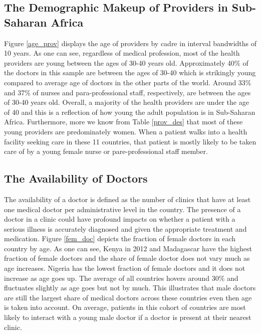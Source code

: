\documentclass{article}                 %
\begin{document}
	\subsection{The Demographic Makeup of Providers in Sub-Saharan Africa}
	
	Figure \ref{age_prov} displays the age of providers by cadre in interval bandwidths of 10 years. As one can see, regardless of medical profession, most of the health providers are young between the ages of 30-40 years old. Approximately 40\% of the doctors in this sample are between the ages of 30-40 which is strikingly young compared to average age of doctors in the other parts of the world. Around 33\% and 37\% of nurses and para-professional staff, respectively, are between the ages of 30-40 years old. Overall, a majority of the health providers are under the age of 40 and this is a reflection of how young the adult population is in Sub-Saharan Africa. Furthermore, more we know from Table \ref{prov_des} that most of these young providers are predominately women. When a patient walks into a health facility seeking care in these 11 countries, that patient is mostly likely to be taken care of by a young female nurse or pare-professional staff member.
			
	\subsection{The Availability of Doctors}			
	
	The availability of a doctor is defined as  the number of clinics that have at least one medical doctor per administrative level in the country. The presence of a doctor in a clinic could have profound impacts on  whether a patient with a serious illness is accurately diagnosed and given the appropriate treatment and medication. Figure \ref{fem_doc} depicts the fraction of female doctors in each country by age. As one can see, Kenya in 2012 and Madagascar have the highest fraction of female doctors and the share of female doctor does not vary much as age increases. Nigeria has the lowest fraction of female doctors and it does not increase as age goes up. The average of all countries hovers around 30\% and fluctuates slightly as age goes but not by much. This illustrates that male doctors are still the largest share of medical doctors across these countries even then age is taken into account. On average, patients in this cohort of countries are most likely to interact with a young male doctor if a doctor is present at their nearest clinic.  
	
\end{document}
